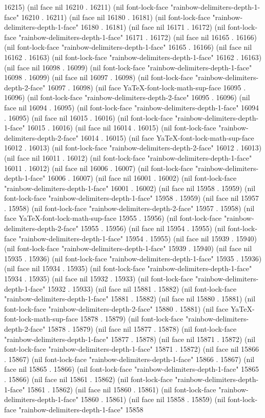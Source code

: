 16215) (nil face nil 16210 . 16211) (nil font-lock-face "rainbow-delimiters-depth-1-face" 16210 . 16211) (nil face nil 16180 . 16181) (nil font-lock-face "rainbow-delimiters-depth-1-face" 16180 . 16181) (nil face nil 16171 . 16172) (nil font-lock-face "rainbow-delimiters-depth-1-face" 16171 . 16172) (nil face nil 16165 . 16166) (nil font-lock-face "rainbow-delimiters-depth-1-face" 16165 . 16166) (nil face nil 16162 . 16163) (nil font-lock-face "rainbow-delimiters-depth-1-face" 16162 . 16163) (nil face nil 16098 . 16099) (nil font-lock-face "rainbow-delimiters-depth-1-face" 16098 . 16099) (nil face nil 16097 . 16098) (nil font-lock-face "rainbow-delimiters-depth-2-face" 16097 . 16098) (nil face YaTeX-font-lock-math-sup-face 16095 . 16096) (nil font-lock-face "rainbow-delimiters-depth-2-face" 16095 . 16096) (nil face nil 16094 . 16095) (nil font-lock-face "rainbow-delimiters-depth-1-face" 16094 . 16095) (nil face nil 16015 . 16016) (nil font-lock-face "rainbow-delimiters-depth-1-face" 16015 . 16016) (nil face nil 16014 . 16015) (nil font-lock-face "rainbow-delimiters-depth-2-face" 16014 . 16015) (nil face YaTeX-font-lock-math-sup-face 16012 . 16013) (nil font-lock-face "rainbow-delimiters-depth-2-face" 16012 . 16013) (nil face nil 16011 . 16012) (nil font-lock-face "rainbow-delimiters-depth-1-face" 16011 . 16012) (nil face nil 16006 . 16007) (nil font-lock-face "rainbow-delimiters-depth-1-face" 16006 . 16007) (nil face nil 16001 . 16002) (nil font-lock-face "rainbow-delimiters-depth-1-face" 16001 . 16002) (nil face nil 15958 . 15959) (nil font-lock-face "rainbow-delimiters-depth-1-face" 15958 . 15959) (nil face nil 15957 . 15958) (nil font-lock-face "rainbow-delimiters-depth-2-face" 15957 . 15958) (nil face YaTeX-font-lock-math-sup-face 15955 . 15956) (nil font-lock-face "rainbow-delimiters-depth-2-face" 15955 . 15956) (nil face nil 15954 . 15955) (nil font-lock-face "rainbow-delimiters-depth-1-face" 15954 . 15955) (nil face nil 15939 . 15940) (nil font-lock-face "rainbow-delimiters-depth-1-face" 15939 . 15940) (nil face nil 15935 . 15936) (nil font-lock-face "rainbow-delimiters-depth-1-face" 15935 . 15936) (nil face nil 15934 . 15935) (nil font-lock-face "rainbow-delimiters-depth-1-face" 15934 . 15935) (nil face nil 15932 . 15933) (nil font-lock-face "rainbow-delimiters-depth-1-face" 15932 . 15933) (nil face nil 15881 . 15882) (nil font-lock-face "rainbow-delimiters-depth-1-face" 15881 . 15882) (nil face nil 15880 . 15881) (nil font-lock-face "rainbow-delimiters-depth-2-face" 15880 . 15881) (nil face YaTeX-font-lock-math-sup-face 15878 . 15879) (nil font-lock-face "rainbow-delimiters-depth-2-face" 15878 . 15879) (nil face nil 15877 . 15878) (nil font-lock-face "rainbow-delimiters-depth-1-face" 15877 . 15878) (nil face nil 15871 . 15872) (nil font-lock-face "rainbow-delimiters-depth-1-face" 15871 . 15872) (nil face nil 15866 . 15867) (nil font-lock-face "rainbow-delimiters-depth-1-face" 15866 . 15867) (nil face nil 15865 . 15866) (nil font-lock-face "rainbow-delimiters-depth-1-face" 15865 . 15866) (nil face nil 15861 . 15862) (nil font-lock-face "rainbow-delimiters-depth-1-face" 15861 . 15862) (nil face nil 15860 . 15861) (nil font-lock-face "rainbow-delimiters-depth-1-face" 15860 . 15861) (nil face nil 15858 . 15859) (nil font-lock-face "rainbow-delimiters-depth-1-face" 15858 